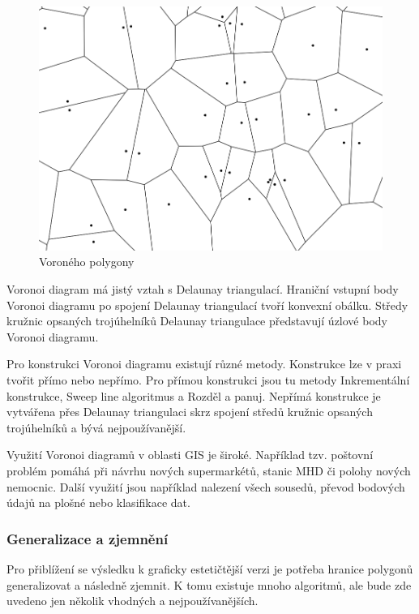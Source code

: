\begin{figure}[H] \centering
    \includegraphics[width=400pt]{./pictures/voronoi.png}
    \caption[Voroného polygony]{Voroného polygony}
	\label{fig:voronoi}              
\end{figure}   

Voronoi diagram má jistý vztah s Delaunay triangulací. Hraniční vstupní body
Voronoi diagramu po spojení Delaunay triangulací tvoří konvexní obálku.
Středy kružnic opsaných trojúhelníků Delaunay triangulace představují úzlové body
Voronoi diagramu.

Pro konstrukci Voronoi diagramu existují různé metody. Konstrukce lze v praxi tvořit přímo nebo nepřímo.
Pro přímou konstrukci jsou tu metody Inkrementální konstrukce, Sweep line algoritmus a
Rozděl a panuj. Nepřímá konstrukce je vytvářena přes Delaunay triangulaci skrz spojení středů
kružnic opsaných trojúhelníků a bývá nejpoužívanější. 

Využití Voronoi diagramů v oblasti GIS je široké. Například tzv. poštovní problém
pomáhá při návrhu nových supermarkétů, stanic MHD či polohy nových nemocnic.
Další využití jsou například nalezení všech sousedů, převod bodových údajů na plošné
nebo klasifikace dat. \cite{bayer-voronoi}

\subsubsection{Generalizace a zjemnění}
\label{generalizace_zjemneni}

Pro přiblížení se výsledku k graficky estetičtější verzi je potřeba hranice polygonů
generalizovat a následně zjemnit. K tomu existuje mnoho algoritmů, ale bude zde uvedeno
jen několik vhodných a nejpoužívanějších.

